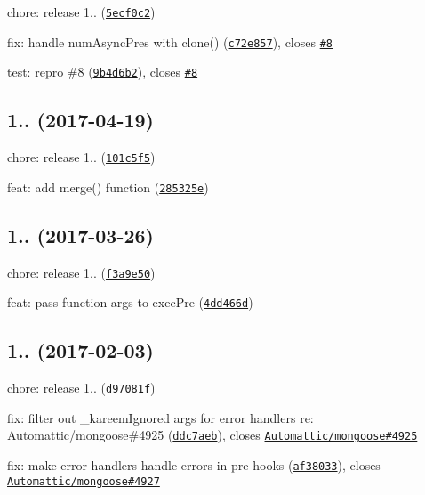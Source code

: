 \begin{DoxyItemize}
\item chore\+: release 1.. (\href{https://github.com/vkarpov15/kareem/commit/5ecf0c2}{\tt 5ecf0c2})
\item fix\+: handle num\+Async\+Pres with clone() (\href{https://github.com/vkarpov15/kareem/commit/c72e857}{\tt c72e857}), closes \href{https://github.com/vkarpov15/kareem/issues/8}{\tt \#8}
\item test\+: repro \#8 (\href{https://github.com/vkarpov15/kareem/commit/9b4d6b2}{\tt 9b4d6b2}), closes \href{https://github.com/vkarpov15/kareem/issues/8}{\tt \#8}
\end{DoxyItemize}

\label{_1.4.0}%
 \subsection*{1.. (2017-\/04-\/19)}


\begin{DoxyItemize}
\item chore\+: release 1.. (\href{https://github.com/vkarpov15/kareem/commit/101c5f5}{\tt 101c5f5})
\item feat\+: add merge() function (\href{https://github.com/vkarpov15/kareem/commit/285325e}{\tt 285325e})
\end{DoxyItemize}

\label{_1.3.0}%
 \subsection*{1.. (2017-\/03-\/26)}


\begin{DoxyItemize}
\item chore\+: release 1.. (\href{https://github.com/vkarpov15/kareem/commit/f3a9e50}{\tt f3a9e50})
\item feat\+: pass function args to exec\+Pre (\href{https://github.com/vkarpov15/kareem/commit/4dd466d}{\tt 4dd466d})
\end{DoxyItemize}

\label{_1.2.1}%
 \subsection*{
\footnotesize 1.. (2017-\/02-\/03)
\normalsize }


\begin{DoxyItemize}
\item chore\+: release 1.. (\href{https://github.com/vkarpov15/kareem/commit/d97081f}{\tt d97081f})
\item fix\+: filter out \+\_\+kareem\+Ignored args for error handlers re\+: Automattic/mongoose\#4925 (\href{https://github.com/vkarpov15/kareem/commit/ddc7aeb}{\tt ddc7aeb}), closes \href{https://github.com/Automattic/mongoose/issues/4925}{\tt Automattic/mongoose\#4925}
\item fix\+: make error handlers handle errors in pre hooks (\href{https://github.com/vkarpov15/kareem/commit/af38033}{\tt af38033}), closes \href{https://github.com/Automattic/mongoose/issues/4927}{\tt Automattic/mongoose\#4927}
\end{DoxyItemize}

